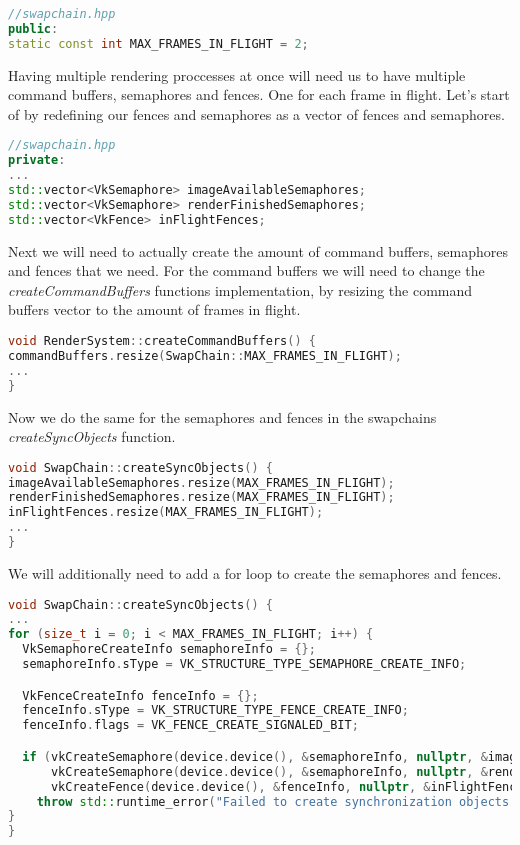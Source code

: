 \documentclass[12pt]{report} \usepackage{preamble}
\begin{document}
\begin{lstlisting}[language=C++]
//swapchain.hpp
public:
static const int MAX_FRAMES_IN_FLIGHT = 2;
\end{lstlisting}

Having multiple rendering proccesses at once will need us to have multiple command buffers, semaphores and fences.
One for each frame in flight. Let's start of by redefining our fences and semaphores as a vector of fences and semaphores.

\begin{lstlisting}[language=C++]
//swapchain.hpp
private:
...
std::vector<VkSemaphore> imageAvailableSemaphores;
std::vector<VkSemaphore> renderFinishedSemaphores;
std::vector<VkFence> inFlightFences;
\end{lstlisting}

Next we will need to actually create the amount of command buffers, semaphores and fences that we need. For the
command buffers we will need to change the \textit{createCommandBuffers} functions implementation, by resizing the command buffers
vector to the amount of frames in flight.

\begin{lstlisting}[language=C++]
void RenderSystem::createCommandBuffers() {
commandBuffers.resize(SwapChain::MAX_FRAMES_IN_FLIGHT);
...
}
\end{lstlisting}

Now we do the same for the semaphores and fences in the swapchains \textit{createSyncObjects} function.

\begin{lstlisting}[language=C++]
void SwapChain::createSyncObjects() {
imageAvailableSemaphores.resize(MAX_FRAMES_IN_FLIGHT);
renderFinishedSemaphores.resize(MAX_FRAMES_IN_FLIGHT);
inFlightFences.resize(MAX_FRAMES_IN_FLIGHT);
...
}
\end{lstlisting}

We will additionally need to add a for loop to create the semaphores and fences.

\begin{lstlisting}[language=C++]
void SwapChain::createSyncObjects() {
...
for (size_t i = 0; i < MAX_FRAMES_IN_FLIGHT; i++) {
  VkSemaphoreCreateInfo semaphoreInfo = {};
  semaphoreInfo.sType = VK_STRUCTURE_TYPE_SEMAPHORE_CREATE_INFO;

  VkFenceCreateInfo fenceInfo = {};
  fenceInfo.sType = VK_STRUCTURE_TYPE_FENCE_CREATE_INFO;
  fenceInfo.flags = VK_FENCE_CREATE_SIGNALED_BIT;

  if (vkCreateSemaphore(device.device(), &semaphoreInfo, nullptr, &imageAvailableSemaphores[i]) != VK_SUCCESS ||
      vkCreateSemaphore(device.device(), &semaphoreInfo, nullptr, &renderFinishedSemaphores[i]) != VK_SUCCESS ||
      vkCreateFence(device.device(), &fenceInfo, nullptr, &inFlightFences[i]) != VK_SUCCESS)
    throw std::runtime_error("Failed to create synchronization objects!");
}
}
\end{lstlisting}
\end{document}
